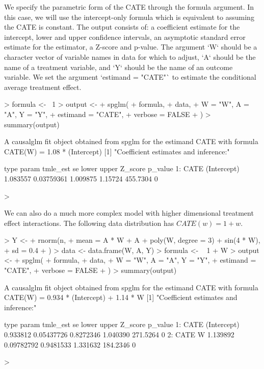 \documentclass{article}
\begin{document}
We specify the parametric form of the CATE through the formula argument. In this case, we will use the intercept-only formula which is equivalent to assuming the CATE is constant.  The output consists of:
a coefficient estimate for the intercept, lower and upper confidence intervals, an asymptotic standard error estimate for the estimator, a Z-score and p-value. The argument `W` should be a character vector of variable names in data for which to adjust, `A` should be the name of a treatment variable, and `Y` should be the name of an outcome variable. We set the argument `estimand = "CATE"` to estimate the conditional average treatment effect.
\begin{Schunk}
\begin{Sinput}
> formula <- ~1
> output <-
+   spglm(
+     formula,
+     data,
+     W = "W", A = "A", Y = "Y",
+     estimand = "CATE",
+     verbose = FALSE
+   )
> summary(output)
\end{Sinput}
\begin{Soutput}
A causalglm fit object obtained from spglm for the estimand CATE with formula 
CATE(W) = 1.08 * (Intercept)
[1] "Coefficient estimates and inference:"

   type       param tmle_est         se    lower   upper  Z_score p_value
1: CATE (Intercept) 1.083557 0.03759361 1.009875 1.15724 455.7304       0
\end{Soutput}
\begin{Sinput}
> 
\end{Sinput}
\end{Schunk}
We can also do a much more complex model with higher dimensional treatment effect interactions. The following data distribution has $CATE(w) = 1 + w$.  
\begin{Schunk}
\begin{Sinput}
> Y <-
+   rnorm(n,
+     mean = A * W + A + poly(W, degree = 3) + sin(4 * W),
+     sd = 0.4
+   )
> data <- data.frame(W, A, Y)
> formula <- ~ 1 + W
> output <-
+   spglm(
+     formula,
+     data,
+     W = "W", A = "A", Y = "Y",
+     estimand = "CATE",
+     verbose = FALSE
+   )
> summary(output)
\end{Sinput}
\begin{Soutput}
A causalglm fit object obtained from spglm for the estimand CATE with formula 
CATE(W) = 0.934 * (Intercept) + 1.14 * W
[1] "Coefficient estimates and inference:"

   type       param tmle_est         se     lower    upper  Z_score p_value
1: CATE (Intercept) 0.933812 0.05437726 0.8272346 1.040390 271.5264       0
2: CATE           W 1.139892 0.09782792 0.9481533 1.331632 184.2346       0
\end{Soutput}
\begin{Sinput}
> 
\end{Sinput}
\end{Schunk}
\end{document}
